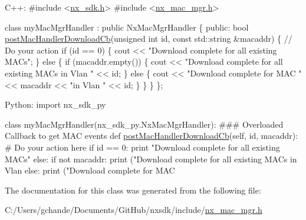 \begin{DoxyCode}
C++:
\textcolor{preprocessor}{   #include <\mbox{\hyperlink{nx__sdk_8h}{nx\_sdk.h}}>}
\textcolor{preprocessor}{   #include <\mbox{\hyperlink{nx__mac__mgr_8h}{nx\_mac\_mgr.h}}>}

   \textcolor{keyword}{class }myMacMgrHandler : \textcolor{keyword}{public} NxMacMgrHandler \{
      \textcolor{keyword}{public}:
         \textcolor{keywordtype}{bool} \mbox{\hyperlink{classnxos_1_1_nx_mac_mgr_handler_a42d84c9f4da1211024912efd4416827e}{postMacHandlerDownloadCb}}(\textcolor{keywordtype}{unsigned} \textcolor{keywordtype}{int} \textcolor{keywordtype}{id}, 
                                       \textcolor{keyword}{const} std::string &macaddr) \{
              \textcolor{comment}{// Do your action}
              \textcolor{keywordflow}{if} (\textcolor{keywordtype}{id} == 0) \{
                  cout << \textcolor{stringliteral}{"Download complete for all existing MACs"};
              \} \textcolor{keywordflow}{else} \{
                  \textcolor{keywordflow}{if} (macaddr.empty()) \{
                      cout << \textcolor{stringliteral}{"Download complete for all existing MACs in Vlan "} << id;
                  \} \textcolor{keywordflow}{else} \{
                       cout << \textcolor{stringliteral}{"Download complete for MAC "} << macaddr << \textcolor{stringliteral}{"in Vlan "} << id;
                  \}
              \}
         \}
   \};

Python:
   \textcolor{keyword}{import} nx\_sdk\_py

   \textcolor{keyword}{class }myMacMgrHandler(nx\_sdk\_py.NxMacMgrHandler):
\textcolor{preprocessor}{   ### Overloaded Callback to get MAC events}
         def \mbox{\hyperlink{classnxos_1_1_nx_mac_mgr_handler_a42d84c9f4da1211024912efd4416827e}{postMacHandlerDownloadCb}}(self, id, macaddr):
\textcolor{preprocessor}{             # Do your action here}
             if id == 0:
                print "Download complete for all existing MACs"
             else:
                if not macaddr:
                   print ("Download complete for all existing MACs in Vlan %
                else:
                   print ("Download complete for MAC %
\end{DoxyCode}
 

The documentation for this class was generated from the following file\+:\begin{DoxyCompactItemize}
\item 
C\+:/\+Users/gchande/\+Documents/\+Git\+Hub/nxsdk/include/\mbox{\hyperlink{nx__mac__mgr_8h}{nx\+\_\+mac\+\_\+mgr.\+h}}\end{DoxyCompactItemize}
